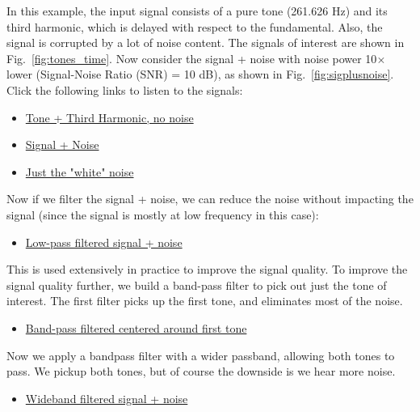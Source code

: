 In this example, the input signal consists of a pure tone (261.626 Hz) and its third harmonic, which is delayed with respect to the fundamental.  Also, the signal is corrupted by a lot of noise content.  The signals of interest are shown in Fig.~\ref{fig:tones_time}.   Now consider the signal + noise with noise power 10$\times$ lower (Signal-Noise Ratio (SNR) = 10 dB), as shown in Fig.~\ref{fig:sigplusnoise}.
Click the following links to listen to the signals:
    \begin{itemize}
        \item \href{http://rfic.eecs.berkeley.edu/~niknejad/photos/ee105/tones.mp3}{Tone + Third Harmonic, no noise}
        \item  \href{http://rfic.eecs.berkeley.edu/~niknejad/photos/ee105/tones\_noise.mp3}{Signal + Noise}
        \item \href{http://rfic.eecs.berkeley.edu/~niknejad/photos/ee105/noise.mp3}{Just the "white" noise}
    \end{itemize}	
Now if we filter the signal + noise, we can reduce the noise without impacting the signal (since the signal is mostly at low frequency in this case):
    \begin{itemize}
        \item  \href{http://rfic.eecs.berkeley.edu/~niknejad/photos/ee105/tones\_lpf.mp3}{Low-pass filtered signal + noise}
    \end{itemize}
 This is used extensively in practice to improve the signal quality.  To improve the signal quality further, we build a band-pass filter to pick out just the tone of interest.  The first filter picks up the first tone, and eliminates most of the noise.
    \begin{itemize}
        \item \href{http://rfic.eecs.berkeley.edu/~niknejad/photos/ee105/tones\_bpf\_wC.mp3}{Band-pass filtered centered around first tone}
    \end{itemize}
Now we apply a bandpass filter with a  wider passband, allowing both tones to pass.  We pickup both tones, but of course the downside is we hear more noise.
    \begin{itemize}
        \item  \href{http://rfic.eecs.berkeley.edu/~niknejad/photos/ee105/tones\_bpf.mp3}{Wideband filtered signal + noise} 
    \end{itemize}
